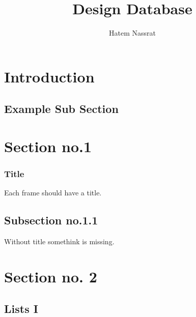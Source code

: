 \documentclass{beamer}
\title{Design Database}
\author{Hatem Nassrat}
\institute[2009]
{
  \deptlogo
}
\begin{document}
\frame{\titlepage}


\section[Outline]{}

\frame{\tableofcontents}


\section{Introduction}


\subsection{Example Sub Section}



\section{Section no.1}

\begin{frame}\frametitle{Title}
  Each frame should have a title.
\end{frame}
\subsection{Subsection no.1.1  }
\begin{frame}
  Without title somethink is missing.
\end{frame}


\section{Section no. 2}

\subsection{Lists I}
\end{document}
